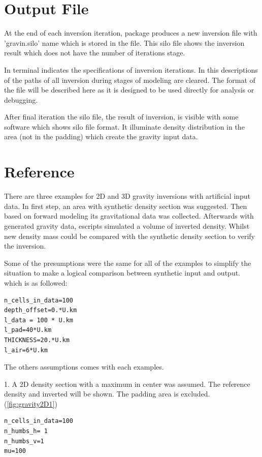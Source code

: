 \section{Output File}

At the end of each inversion iteration, package produces a new inversion file with 'gravin.silo' name which is stored in the file. This silo file shows the inversion result which does not have the number of iterations stage.

 In terminal indicates the specifications of inversion iterations. In this descriptions of the paths of all inversion during stages of modeling are cleared. The format of the file will be described here as it is designed to be used directly for analysis or debugging.

After final iteration the silo file, the result of inversion, is visible with some software which shows silo file format. It illuminate density distribution in the area (not in the padding) which create the gravity input data.

\section{Reference}

There are three examples for 2D and 3D gravity inversions with artificial input data.
In first step, an area with synthetic density section was suggested. Then based on forward modeling its gravitational data was collected. Afterwards with generated gravity data, escripts simulated a volume of inverted density. Whilst new density mass could be compared with the synthetic density section to verify the inversion.

Some of the presumptions were the same for all of the examples to simplify the situation to make a logical comparison between synthetic input and output. which is as followed:

\begin{verbatim}
n_cells_in_data=100
depth_offset=0.*U.km
l_data = 100 * U.km
l_pad=40*U.km
THICKNESS=20.*U.km
l_air=6*U.km
\end{verbatim}

The others assumptions comes with each examples.

1.  A 2D density section with a maximum in center was assumed. The reference density and inverted will be shown. The padding area is excluded. (\ref{fig:gravity2D1})

\begin{verbatim}
n_cells_in_data=100
n_humbs_h= 1
n_humbs_v=1
mu=100
\end{verbatim}


